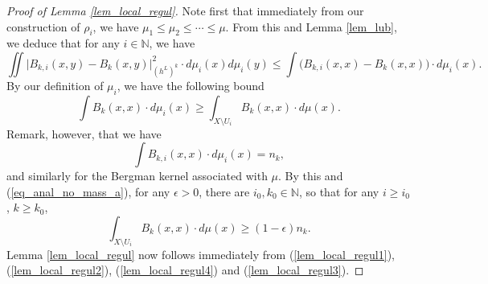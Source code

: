 \documentclass[12pt]{article}
\numberwithin{equation}{section}
\theoremstyle{theorem}
\theoremstyle{definition}
\theoremstyle{remark}
\newcommand{\nat}{\mathbb{N}}
\begin{document}
	\begin{proof}[Proof of Lemma \ref{lem_local_regul}]
		Note first that immediately from our construction of $\rho_i$, we have $\mu_1 \leq \mu_2 \leq \cdots \leq \mu$.
		From this and Lemma \ref{lem_lub}, we deduce that for any $i \in \nat$, we have
		\begin{equation}\label{lem_local_regul1}
			\iint
			\Big|
			B_{k, i}(x, y)
			-
			B_{k}(x, y)
			\Big|_{(h^L)^k}^2 
			\cdot
			d \mu_i(x)
			d \mu_i(y)
			\leq
			\int
			\Big(
			B_{k, i}(x, x)
			-
			B_{k}(x, x)
			\Big)
			\cdot
			d \mu_i(x).
		\end{equation}
		By our definition of $\mu_i$, we have the following bound
		\begin{equation}\label{lem_local_regul2}
			\int
			B_{k}(x, x)
			\cdot
			d \mu_i(x)
			\geq
			\int_{X \setminus U_i}
			B_{k}(x, x)
			\cdot
			d \mu(x).
		\end{equation}
		Remark, however, that we have
		\begin{equation}\label{lem_local_regul4}
			\int
			B_{k, i}(x, x)
			\cdot
			d \mu_i(x) = n_k, 
		\end{equation}
		and similarly for the Bergman kernel associated with $\mu$.
		By this and (\ref{eq_anal_no_mass_a}), for any $\epsilon > 0$, there are $i_0, k_0 \in \nat$, so that for any $i \geq i_0$, $k \geq k_0$,
		\begin{equation}\label{lem_local_regul3}
			\int_{X \setminus U_i}
			B_{k}(x, x)
			\cdot
			d \mu(x)
			\geq
			(1-\epsilon)n_k.
		\end{equation}
		Lemma \ref{lem_local_regul} now follows immediately from (\ref{lem_local_regul1}), (\ref{lem_local_regul2}), (\ref{lem_local_regul4}) and (\ref{lem_local_regul3}).
	\end{proof}
\end{document}
